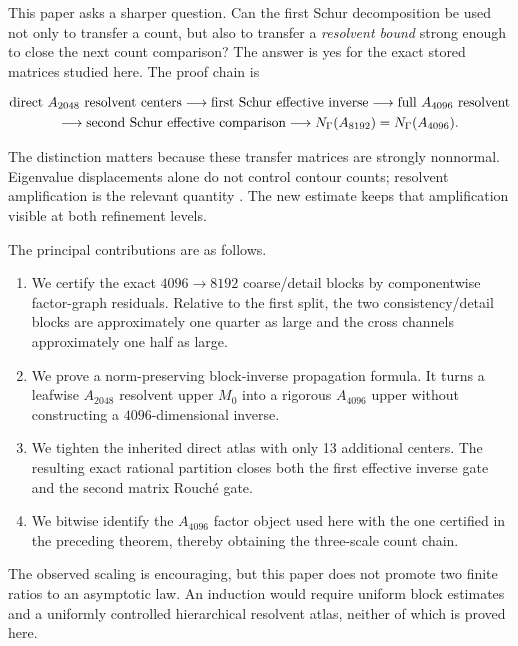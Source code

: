 \documentclass[11pt]{article}
\theoremstyle{definition}
\theoremstyle{remark}
\begin{document}
This paper asks a sharper question.  Can the first Schur decomposition be
used not only to transfer a count, but also to transfer a \emph{resolvent
bound} strong enough to close the next count comparison?  The answer is yes
for the exact stored matrices studied here.  The proof chain is

\[
\begin{gathered}
\text{direct }A_{2048}\text{ resolvent centers}
\longrightarrow
\text{first Schur effective inverse}
\longrightarrow
\text{full }A_{4096}\text{ resolvent}\notag\\
\longrightarrow
\text{second Schur effective comparison}
\longrightarrow
N_{\Gamma}(A_{8192})=N_{\Gamma}(A_{4096}).
\end{gathered}
\]

The distinction matters because these transfer matrices are strongly
nonnormal.  Eigenvalue displacements alone do not control contour counts;
resolvent amplification is the relevant quantity
\citep{Kato1995,TrefethenEmbree2005}.  The new estimate keeps that amplification
visible at both refinement levels.

The principal contributions are as follows.

\begin{enumerate}[leftmargin=2em]
 \item We certify the exact $4096\to8192$ coarse/detail blocks by
       componentwise factor-graph residuals.  Relative to the first split,
       the two consistency/detail blocks are approximately one quarter as
       large and the cross channels approximately one half as large.
 \item We prove a norm-preserving block-inverse propagation formula.  It turns
       a leafwise $A_{2048}$ resolvent upper $M_0$ into a rigorous
       $A_{4096}$ upper without constructing a $4096$-dimensional inverse.
 \item We tighten the inherited direct atlas with only 13 additional centers.
       The resulting exact rational partition closes both the first effective
       inverse gate and the second matrix Rouch\'e gate.
 \item We bitwise identify the $A_{4096}$ factor object used here with the
       one certified in the preceding theorem, thereby obtaining the
       three-scale count chain.
\end{enumerate}

The observed scaling is encouraging, but this paper does not promote two
finite ratios to an asymptotic law.  An induction would require uniform block
estimates and a uniformly controlled hierarchical resolvent atlas, neither of
which is proved here.
\end{document}

